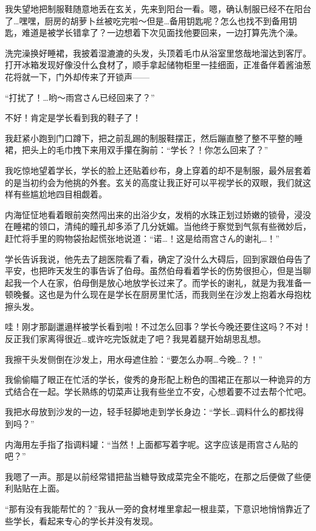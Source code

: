 我失望地把制服鞋随意地丢在玄关，先来到阳台一看。嗯，确认制服已经不在阳台了…嘿嘿，厨房的胡萝卜丝被吃完啦～但是…备用钥匙呢？怎么也找不到备用钥匙，难道是被学长错拿了？一边想着下次见面找他要回来，一边打算先洗个澡。

洗完澡换好睡裙，我披着湿漉漉的头发，头顶着毛巾从浴室里悠哉地溜达到客厅。打开冰箱发现好像没什么食材了，顺手拿起储物柜里一挂细面，正准备伴着酱油葱花将就一下，门外却传来了开锁声——

“打扰了！…哟～雨宫さん已经回来了？”

不好！肯定是学长看到我的鞋子了！

我赶紧小跑到门口蹲下，把之前乱踢的制服鞋摆正，然后蹦直整了整不平整的睡裙，把头上的毛巾拽下来用双手攥在胸前：“学长？！你怎么回来了？”

我吃惊地望着学长，学长的脸上还贴着纱布，身上穿着的却不是制服，最外层套着的是当初约会为他挑的外套。玄关的高度让我正好可以平视学长的双眼，我们就这样有些尴尬地四目相觑着。

内海怔怔地看着眼前突然闯出来的出浴少女，发梢的水珠正划过娇嫩的锁骨，浸没在睡裙的领口，清纯的瞳孔却多添了几分妩媚。当他终于察觉到气氛有些微妙后，赶忙将手里的购物袋抬起慌张地说道：“诺…！这是给雨宫さん的谢礼…！”

学长告诉我说，他先去了趟医院看了看，确定了没什么大碍后，回到家跟伯母告了平安，也把昨天发生的事告诉了伯母。虽然伯母看着学长的伤势很担心，但是当聊起我一个人在家，伯母倒是放心地放学长过来了。而学长的谢礼，就是为我准备一顿晚餐。这也是为什么现在是学长在厨房里忙活，而我则坐在沙发上抱着水母抱枕擦头发。

哇！刚才那副邋遢样被学长看到啦！不过怎么回事？学长今晚还要住这吗？不对！反正我们家离得很近…或许吃完饭就走了吧？我晃着腿开始胡思乱想。

我擦干头发侧倒在沙发上，用水母遮住脸：“要怎么办啊…今晚…？！”

\newday{\food\fullmoon\night}

我偷偷瞄了眼正在忙活的学长，俊秀的身形配上粉色的围裙正在那以一种诡异的方式结合在一起。学长熟练的切菜声让我有些坐立不安，心想着要不过去帮个忙吧。

我把水母放到沙发的一边，轻手轻脚地走到学长身边：“学长…调料什么的都找得到吗？”

内海用左手指了指调料罐：“当然！上面都写着字呢。这字应该是雨宫さん贴的吧？”

我嗯了一声。那是以前经常错把盐当糖导致成菜完全不能吃，在那之后便做了些便利贴贴在上面。

“那有没有我能帮忙的？”我从一旁的食材堆里拿起一根韭菜，下意识地悄悄靠近了些学长，看起来专心的学长并没有发现。

